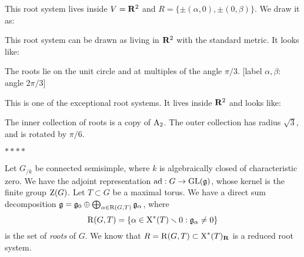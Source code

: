 \begin{example}
This root system lives inside $V=\mathbf{R}^2$ and 
$R=\{\pm (\alpha,0),\pm (0,\beta)\}$. We draw it as: 
\begin{center}
\end{center}
\end{example}


\begin{example}
This root system can be drawn as living in $\mathbf{R}^2$ with the standard metric. It 
looks like:
\begin{center}
\end{center}
The roots lie on the unit circle and at multiples of the angle $\pi/3$. 
[label $\alpha,\beta$: angle $2\pi/3$]
\end{example}

\begin{example}
This is one of the exceptional root systems. It lives inside $\mathbf{R}^2$ and looks 
like:
\begin{center}
\end{center}
The inner collection of roots is a copy of $\mathrm{A}_2$. The outer collection 
has radius $\sqrt 3$, and is rotated by $\pi/6$. 
\end{example}

$\ast\ast\ast\ast$

Let $G_{/k}$ be connected semisimple, where $k$ is algebraically closed of 
characteristic zero. We have the adjoint representation 
$\operatorname{ad}:G\to \operatorname{GL}(\mathfrak{g})$, whose kernel is the finite group $\operatorname{Z}(G)$. Let 
$T\subset G$ be a maximal torus. We have a direct sum decomposition 
$\mathfrak{g}=\mathfrak{g}_0\oplus \bigoplus_{\alpha\in \operatorname{R}(G,T)} \mathfrak{g}_\alpha$, where 
\[
  \operatorname{R}(G,T)=\{\alpha\in \operatorname{X}^\ast(T)\smallsetminus 0:\mathfrak{g}_\alpha\ne 0\} 
\]
is the set of \emph{roots} of $G$. We know that 
$R=\operatorname{R}(G,T)\subset \operatorname{X}^\ast(T)_{\mathbf{R}}$ is a reduced root system. 

